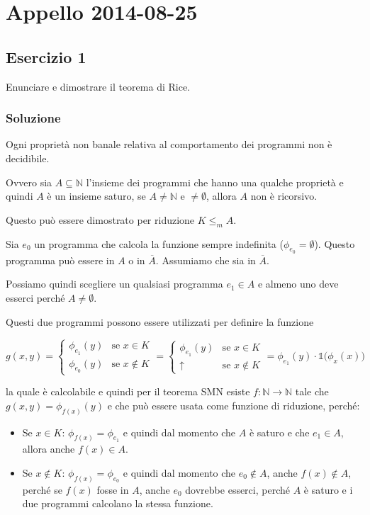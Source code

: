 \section{Appello 2014-08-25}

\subsection{Esercizio 1}

Enunciare e dimostrare il teorema di Rice.

\subsubsection{Soluzione}

Ogni proprietà non banale relativa al comportamento dei programmi non è decidibile. 

Ovvero sia $A \subseteq \mathbb{N}$ l'insieme dei programmi che hanno una qualche proprietà e quindi $A$ è un insieme saturo, se $A \neq \mathbb{N}$ e $\neq \emptyset$, allora $A$ non è ricorsivo.

Questo può essere dimostrato per riduzione $K \leq_m A$.

Sia $e_0$ un programma che calcola la funzione sempre indefinita ($\phi_{e_0} = \emptyset$). Questo programma può essere in $A$ o in $\overline{A}$. Assumiamo che sia in $\overline{A}$.

Possiamo quindi scegliere un qualsiasi programma $e_1 \in A$ e almeno uno deve esserci perché $A \neq \emptyset$.

Questi due programmi possono essere utilizzati per definire la funzione 

$$
g(x,y) = \begin{cases}
\phi_{e_1}(y) &\text{se } x \in K \\
\phi_{e_0}(y) &\text{se } x \notin K
\end{cases} = \begin{cases}
\phi_{e_1}(y) &\text{se } x \in K \\
\uparrow &\text{se } x \notin K
\end{cases} = \phi_{e_1}(y) \cdot \mathbb{1}\big(\phi_x(x) \big)
$$ 

la quale è calcolabile e quindi per il teorema SMN esiste $f : \mathbb{N} \rightarrow \mathbb{N}$ tale che $g(x,y) = \phi_{f(x)}(y)$ e che può essere usata come funzione di riduzione, perché:

\begin{itemize}
	\item Se $x \in K$: $\phi_{f(x)} = \phi_{e_1}$ e quindi dal momento che $A$ è saturo e che $e_1 \in A$, allora anche $f(x) \in A$.
	\item Se $x \notin K$: $\phi_{f(x)} = \phi_{e_0}$ e quindi dal momento che $e_0 \notin A$, anche $f(x) \notin A$, perché se $f(x)$ fosse in $A$, anche $e_0$ dovrebbe esserci, perché $A$ è saturo e i due programmi calcolano la stessa funzione.
\end{itemize}


